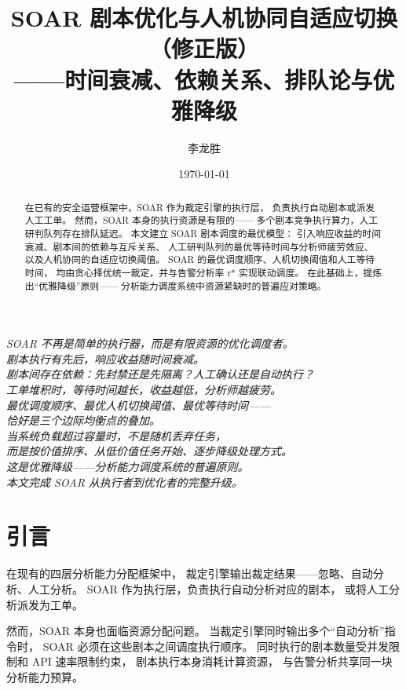 \documentclass[11pt,a4paper]{article}
\title{SOAR 剧本优化与人机协同自适应切换（修正版）\\
——时间衰减、依赖关系、排队论与优雅降级}
\author{李龙胜}
\date{\today}
\begin{document}
\maketitle

\begin{center}
\textit{
SOAR 不再是简单的执行器，而是有限资源的优化调度者。\\
剧本执行有先后，响应收益随时间衰减。\\
剧本间存在依赖：先封禁还是先隔离？人工确认还是自动执行？\\
工单堆积时，等待时间越长，收益越低，分析师越疲劳。\\
最优调度顺序、最优人机切换阈值、最优等待时间——\\
恰好是三个边际均衡点的叠加。\\
当系统负载超过容量时，不是随机丢弃任务，\\
而是按价值排序、从低价值任务开始、逐步降级处理方式。\\
这是优雅降级——分析能力调度系统的普遍原则。\\
本文完成 SOAR 从执行者到优化者的完整升级。
}
\end{center}

\vspace{5mm}

\begin{abstract}
在已有的安全运营框架中，SOAR 作为裁定引擎的执行层，
负责执行自动剧本或派发人工工单。
然而，SOAR 本身的执行资源是有限的——
多个剧本竞争执行算力，人工研判队列存在排队延迟。
本文建立 SOAR 剧本调度的最优模型：
引入响应收益的时间衰减、剧本间的依赖与互斥关系、
人工研判队列的最优等待时间与分析师疲劳效应、
以及人机协同的自适应切换阈值。
SOAR 的最优调度顺序、人机切换阈值和人工等待时间，
均由贪心择优统一裁定，并与告警分析率 r* 实现联动调度。
在此基础上，提炼出“优雅降级”原则——
分析能力调度系统中资源紧缺时的普遍应对策略。
\end{abstract}

\tableofcontents

\section{引言}

在现有的四层分析能力分配框架中，
裁定引擎输出裁定结果——忽略、自动分析、人工分析。
SOAR 作为执行层，负责执行自动分析对应的剧本，
或将人工分析派发为工单。

然而，SOAR 本身也面临资源分配问题。
当裁定引擎同时输出多个“自动分析”指令时，
SOAR 必须在这些剧本之间调度执行顺序。
同时执行的剧本数量受并发限制和 API 速率限制约束，
剧本执行本身消耗计算资源，
与告警分析共享同一块分析能力预算。
\end{document}
